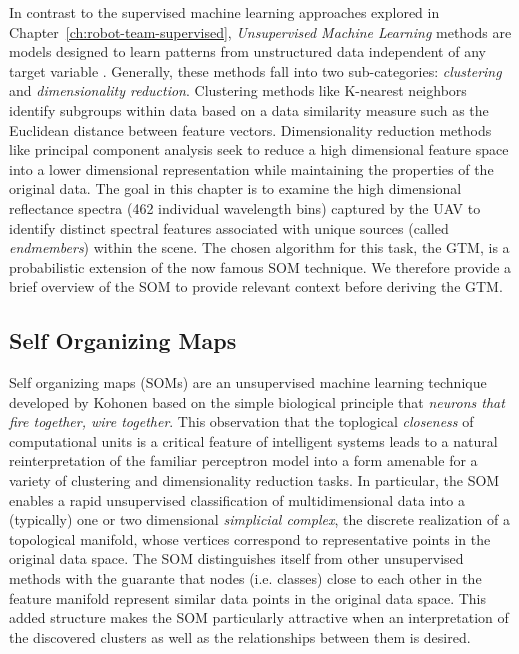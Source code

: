In contrast to the supervised machine learning approaches explored in
Chapter~\ref{ch:robot-team-supervised}, \textit{Unsupervised Machine Learning}
methods are models designed to learn patterns from unstructured data independent
of any target variable \cite{bishop-prml}. Generally, these methods fall into
two sub-categories: \textit{clustering} and \textit{dimensionality reduction}.
Clustering methods like K-nearest neighbors identify subgroups within data based
on a data similarity measure such as the Euclidean distance between feature
vectors. Dimensionality reduction methods like principal component analysis
seek to reduce a high dimensional feature space into a lower dimensional
representation while maintaining the properties of the original data. The
goal in this chapter is to examine the high dimensional reflectance spectra (462
individual wavelength bins) captured by the UAV to identify distinct spectral
features associated with unique sources (called \textit{endmembers}) within the
scene. The chosen algorithm for this task, the GTM, is a probabilistic extension
of the now famous SOM technique. We therefore provide a brief overview of the
SOM to provide relevant context before deriving the GTM.

\subsection{Self Organizing Maps}

Self organizing maps (SOMs) are an unsupervised machine learning technique
developed by Kohonen \cite{kohonen-som-1} based on the simple biological
principle that \textit{neurons that fire together, wire together}. This
observation that the toplogical \textit{closeness} of computational
units is a critical feature of intelligent systems leads to a natural
reinterpretation of the familiar perceptron model into a form amenable for a
variety of clustering and dimensionality reduction tasks. In particular, the SOM
enables a rapid unsupervised classification of multidimensional data into a
(typically) one or two dimensional \textit{simplicial complex}, the discrete
realization of a topological manifold, whose vertices correspond to
representative points in the original data space. The SOM distinguishes itself
from other unsupervised methods with the guarante that nodes (i.e. classes)
close to each other in the feature manifold represent similar data points in the
original data space. This added structure makes the SOM
particularly attractive when an interpretation of the discovered clusters as
well as the relationships between them is desired.

